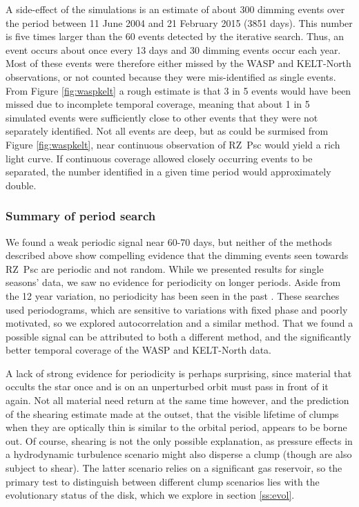 \documentclass[useAMS,usenatbib,usegraphicx]{mn2e}
\begin{document}
A side-effect of the simulations is an estimate of about 300 dimming events over the
period between 11 June 2004 and 21 February 2015 (3851 days). This number is five times
larger than the 60 events detected by the iterative search. Thus, an event occurs about
once every 13 days and 30 dimming events occur each year. Most of these events were
therefore either missed by the WASP and KELT-North observations, or not counted because they
were mis-identified as single events. From Figure \ref{fig:waspkelt} a rough estimate is
that 3 in 5 events would have been missed due to incomplete temporal coverage, meaning
that about 1 in 5 simulated events were sufficiently close to other events that they were
not separately identified. Not all events are deep, but as could be surmised from Figure
\ref{fig:waspkelt}, near continuous observation of RZ~Psc would yield a rich light
curve. If continuous coverage allowed closely occurring events to be separated, the
number identified in a given time period would approximately double.

\subsubsection{Summary of period search}\label{sss:persum}

We found a weak periodic signal near 60-70 days, but neither of the methods described
above show compelling evidence that the dimming events seen towards RZ~Psc are periodic
and not random. While we presented results for single seasons' data, we saw no evidence
for periodicity on longer periods. Aside from the 12 year variation, no periodicity has
been seen in the past \citep{2013A&A...553L...1D}. These searches used periodograms,
which are sensitive to variations with fixed phase and poorly motivated, so we explored
autocorrelation and a similar method. That we found a possible signal can be attributed
to both a different method, and the significantly better temporal coverage of the WASP
and KELT-North data.

A lack of strong evidence for periodicity is perhaps surprising, since material that
occults the star once and is on an unperturbed orbit must pass in front of it again. Not
all material need return at the same time however, and the prediction of the shearing
estimate made at the outset, that the visible lifetime of clumps when they are optically
thin is similar to the orbital period, appears to be borne out. Of course, shearing is
not the only possible explanation, as pressure effects in a hydrodynamic turbulence
scenario might also disperse a clump (though are also subject to shear). The latter
scenario relies on a significant gas reservoir, so the primary test to distinguish
between different clump scenarios lies with the evolutionary status of the disk, which we
explore in section \ref{ss:evol}.
\end{document}
